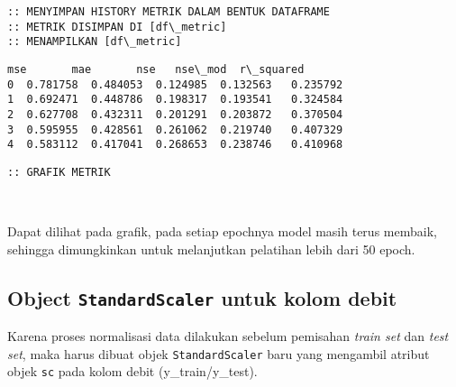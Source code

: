 \documentclass[11pt]{article}
\makeatletter
\newcommand{\boxspacing}{\kern\kvtcb@left@rule\kern\kvtcb@boxsep}
\newcommand{\prompt}[4]{
        \ttfamily\llap{{\color{#2}[#3]:\hspace{3pt}#4}}\vspace{-\baselineskip}
    }
\makeatother
\begin{document}
    \begin{Verbatim}[commandchars=\\\{\}]
:: MENYIMPAN HISTORY METRIK DALAM BENTUK DATAFRAME
:: METRIK DISIMPAN DI [df\_metric]
:: MENAMPILKAN [df\_metric]
    \end{Verbatim}

            \begin{tcolorbox}[breakable, size=fbox, boxrule=.5pt, pad at break*=1mm, opacityfill=0]
\prompt{Out}{outcolor}{57}{\boxspacing}
\begin{Verbatim}[commandchars=\\\{\}]
        mse       mae       nse   nse\_mod  r\_squared
0  0.781758  0.484053  0.124985  0.132563   0.235792
1  0.692471  0.448786  0.198317  0.193541   0.324584
2  0.627708  0.432311  0.201291  0.203872   0.370504
3  0.595955  0.428561  0.261062  0.219740   0.407329
4  0.583112  0.417041  0.268653  0.238746   0.410968
\end{Verbatim}
\end{tcolorbox}
        
    \begin{Verbatim}[commandchars=\\\{\}]
:: GRAFIK METRIK
    \end{Verbatim}

    \begin{center}
    \end{center}
    { \hspace*{\fill} \\}
    
    Dapat dilihat pada grafik, pada setiap epochnya model masih terus
membaik, sehingga dimungkinkan untuk melanjutkan pelatihan lebih dari 50
epoch.

    \hypertarget{object-standardscaler-untuk-kolom-debit}{%
\subsection{\texorpdfstring{Object \texttt{StandardScaler} untuk kolom
debit}{Object StandardScaler untuk kolom debit}}\label{object-standardscaler-untuk-kolom-debit}}

Karena proses normalisasi data dilakukan sebelum pemisahan \emph{train
set} dan \emph{test set}, maka harus dibuat objek
\texttt{StandardScaler} baru yang mengambil atribut objek \texttt{sc}
pada kolom debit (y\_train/y\_test).
\end{document}
